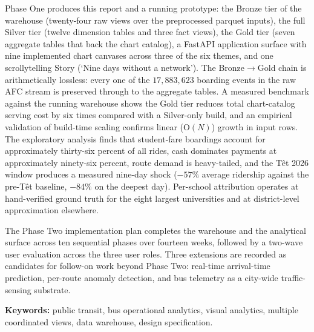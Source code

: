 Phase One produces this report and a running prototype: the Bronze tier of the warehouse (twenty-four raw views over the preprocessed parquet inputs), the full Silver tier (twelve dimension tables and three fact views), the Gold tier (seven aggregate tables that back the chart catalog), a FastAPI application surface with nine implemented chart canvases across three of the six themes, and one scrollytelling Story (`Nine days without a network'). The Bronze\(\rightarrow\)Gold chain is arithmetically lossless: every one of the \(17{,}883{,}623\) boarding events in the raw AFC stream is preserved through to the aggregate tables. A measured benchmark against the running warehouse shows the Gold tier reduces total chart-catalog serving cost by six times compared with a Silver-only build, and an empirical validation of build-time scaling confirms linear (\(\mathrm{O}(N)\)) growth in input rows. The exploratory analysis finds that student-fare boardings account for approximately thirty-six percent of all rides, cash dominates payments at approximately ninety-six percent, route demand is heavy-tailed, and the T\^et 2026 window produces a measured nine-day shock (\(-57\%\) average ridership against the pre-T\^et baseline, \(-84\%\) on the deepest day). Per-school attribution operates at hand-verified ground truth for the eight largest universities and at district-level approximation elsewhere.

The Phase Two implementation plan completes the warehouse and the analytical surface across ten sequential phases over fourteen weeks, followed by a two-wave user evaluation across the three user roles. Three extensions are recorded as candidates for follow-on work beyond Phase Two: real-time arrival-time prediction, per-route anomaly detection, and bus telemetry as a city-wide traffic-sensing substrate.

\vspace{1em}
\noindent\textbf{Keywords:} public transit, bus operational analytics, visual analytics, multiple coordinated views, data warehouse, design specification.
